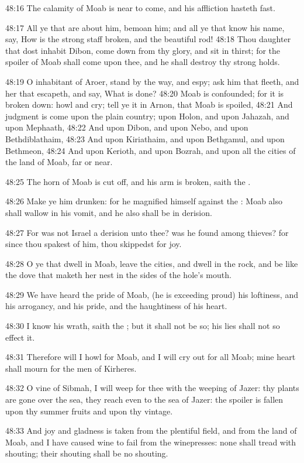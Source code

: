 48:16 The calamity of Moab is near to come, and his affliction hasteth
fast.

48:17 All ye that are about him, bemoan him; and all ye that know his
name, say, How is the strong staff broken, and the beautiful rod!
48:18 Thou daughter that dost inhabit Dibon, come down from thy glory,
and sit in thirst; for the spoiler of Moab shall come upon thee, and
he shall destroy thy strong holds.

48:19 O inhabitant of Aroer, stand by the way, and espy; ask him that
fleeth, and her that escapeth, and say, What is done?  48:20 Moab is
confounded; for it is broken down: howl and cry; tell ye it in Arnon,
that Moab is spoiled, 48:21 And judgment is come upon the plain
country; upon Holon, and upon Jahazah, and upon Mephaath, 48:22 And
upon Dibon, and upon Nebo, and upon Bethdiblathaim, 48:23 And upon
Kiriathaim, and upon Bethgamul, and upon Bethmeon, 48:24 And upon
Kerioth, and upon Bozrah, and upon all the cities of the land of Moab,
far or near.

48:25 The horn of Moab is cut off, and his arm is broken, saith the
\LORD.

48:26 Make ye him drunken: for he magnified himself against the \LORD:
Moab also shall wallow in his vomit, and he also shall be in derision.

48:27 For was not Israel a derision unto thee? was he found among
thieves?  for since thou spakest of him, thou skippedst for joy.

48:28 O ye that dwell in Moab, leave the cities, and dwell in the
rock, and be like the dove that maketh her nest in the sides of the
hole's mouth.

48:29 We have heard the pride of Moab, (he is exceeding proud) his
loftiness, and his arrogancy, and his pride, and the haughtiness of
his heart.

48:30 I know his wrath, saith the \LORD; but it shall not be so; his
lies shall not so effect it.

48:31 Therefore will I howl for Moab, and I will cry out for all Moab;
mine heart shall mourn for the men of Kirheres.

48:32 O vine of Sibmah, I will weep for thee with the weeping of
Jazer: thy plants are gone over the sea, they reach even to the sea of
Jazer: the spoiler is fallen upon thy summer fruits and upon thy
vintage.

48:33 And joy and gladness is taken from the plentiful field, and from
the land of Moab, and I have caused wine to fail from the winepresses:
none shall tread with shouting; their shouting shall be no shouting.

